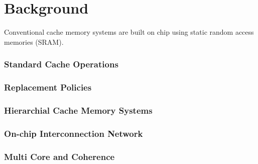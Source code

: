 
%
%

\chapter{Background}
\label{chap:background}

Conventional cache memory systems are built on chip using static random access memories (SRAM). 


\subsection{Standard Cache Operations}
\label{subsec:cache_operations}
\subsection{Replacement Policies}
\subsection{Hierarchial Cache Memory Systems}
\subsection{On-chip Interconnection Network}
\subsection{Multi Core and Coherence}

